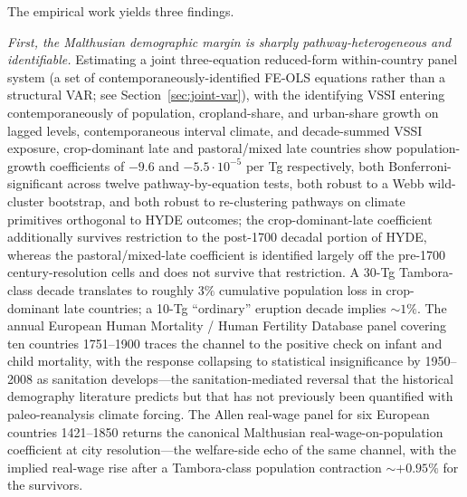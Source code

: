 \documentclass[11pt,letterpaper]{article}
\begin{document}
The empirical work yields three findings.

\emph{First, the Malthusian demographic margin is sharply pathway-heterogeneous and identifiable.} Estimating a joint three-equation reduced-form within-country panel system (a set of contemporaneously-identified FE-OLS equations rather than a structural VAR; see Section~\ref{sec:joint-var}), with the identifying VSSI entering contemporaneously of population, cropland-share, and urban-share growth on lagged levels, contemporaneous interval climate, and decade-summed VSSI exposure, crop-dominant late and pastoral/mixed late countries show population-growth coefficients of $-9.6$ and $-5.5\!\cdot\!10^{-5}$ per Tg respectively, both Bonferroni-significant across twelve pathway-by-equation tests, both robust to a Webb wild-cluster bootstrap, and both robust to re-clustering pathways on climate primitives orthogonal to HYDE outcomes; the crop-dominant-late coefficient additionally survives restriction to the post-1700 decadal portion of HYDE, whereas the pastoral/mixed-late coefficient is identified largely off the pre-1700 century-resolution cells and does not survive that restriction. A 30-Tg Tambora-class decade translates to roughly $3\%$ cumulative population loss in crop-dominant late countries; a 10-Tg ``ordinary'' eruption decade implies $\sim 1\%$. The annual European Human Mortality / Human Fertility Database panel covering ten countries 1751--1900 traces the channel to the positive check on infant and child mortality, with the response collapsing to statistical insignificance by 1950--2008 as sanitation develops---the sanitation-mediated reversal that the historical demography literature \citep{wrigley1981} predicts but that has not previously been quantified with paleo-reanalysis climate forcing. The Allen real-wage panel for six European countries 1421--1850 returns the canonical Malthusian real-wage-on-population coefficient at city resolution---the welfare-side echo of the same channel, with the implied real-wage rise after a Tambora-class population contraction $\sim +0.95\%$ for the survivors.
\end{document}
